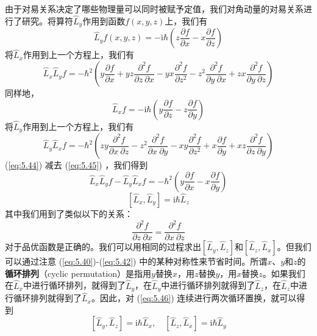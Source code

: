     由于对易关系决定了哪些物理量可以同时被赋予定值，我们对角动量的对易关系进行了研究。将算符$\hat{L}_y$作用到函数$f\left(x,y,z\right)$上，我们有
    \begin{equation*}
        \hat{L}_yf\left(x,y,z\right) = -\mathrm{i}\hbar\left(z\frac{\partial f}{\partial x} - x\frac{\partial f}{\partial z}\right)
    \end{equation*}
    将$\hat{L}_x$作用到上一个方程上，我们有
    \begin{equation}
        \hat{L}_x\hat{L}_yf = -\hbar^2\left(y\frac{\partial f}{\partial x} + yz \frac{\partial^2f}{\partial z \: \partial x} - yx\frac{\partial^2f}{\partial z^2} - z^2\frac{\partial ^2f}{\partial y \: \partial x} + zx\frac{\partial^2f}{\partial y\: \partial z}\right)
        \label{eq:5.44}
    \end{equation}
    同样地，
    \begin{equation*}
        \hat{L}_xf = -\mathrm{i}\hbar\left(y\frac{\partial f}{\partial z} - z\frac{\partial f}{\partial y}\right)
    \end{equation*}
    将$\hat{L}_y$作用到上一个方程上，我们有
    \begin{equation}
        \hat{L}_y\hat{L}_xf = -\hbar^2\left(zy\frac{\partial^2f}{\partial x\: \partial z}  - z^2\frac{\partial ^2f}{\partial x \: \partial y} - xy\frac{\partial^2f}{\partial z^2} + x\frac{\partial f}{\partial y} + xz \frac{\partial^2f}{\partial z \: \partial y}\right)
        \label{eq:5.45}
    \end{equation}
    (\ref{eq:5.44}) 减去 (\ref{eq:5.45}) ，我们得到
    \begin{equation*}
        \hat{L}_x\hat{L}_yf - \hat{L}_y\hat{L}_xf = -\hbar^2\left(y\frac{\partial f}{\partial x} - x\frac{\partial f}{\partial y}\right)
    \end{equation*}
    \begin{equation}
        \left[\hat{L}_x, \hat{L}_y\right] = \mathrm{i}\hbar\hat{L}_z
        \label{eq:5.46}
    \end{equation}
    其中我们用到了类似以下的关系：
    \begin{equation}
        \boxed{
            \frac{\partial ^2f}{\partial z \: \partial x} = \frac{\partial ^2f}{\partial x \: \partial z}
        }
        \label{eq:5.47}
    \end{equation}
    对于品优函数是正确的。我们可以用相同的过程求出$\left[\hat{L}_y, \hat{L}_z\right]$和$\left[\hat{L}_z, \hat{L}_x\right]$。但我们可以通过注意 (\ref{eq:5.40})-(\ref{eq:5.42}) 中的某种对称性来节省时间。所谓$x$、$y$和$z$的\textbf{循环排列}（cyclic permutation）是指用$y$替换$x$，用$z$替换$y$，用$x$替换$z$。如果我们在$\hat{L}_x$中进行循环排列，就得到了$\hat{L}_y$，在$\hat{L}_y$中进行循环排列就得到了$\hat{L}_z$，在$\hat{L}_z$中进行循环排列就得到了$\hat{L}_x$。因此，对 (\ref{eq:5.46}) 连续进行两次循环置换，就可以得到
    \begin{equation}
        \left[\hat{L}_y, \hat{L}_z\right] = \mathrm{i}\hbar\hat{L}_x, \quad \left[\hat{L}_z, \hat{L}_x\right] = \mathrm{i}\hbar\hat{L}_y
        \label{eq:5.48}
    \end{equation}

